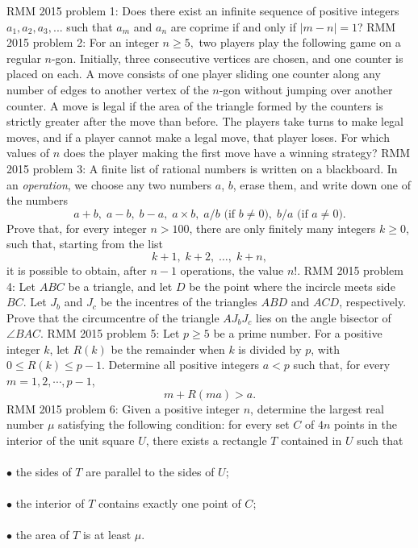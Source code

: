 RMM 2015 problem 1:  Does there exist an infinite sequence of positive integers $a_1, a_2, a_3, . . .$  such that $a_m$ and $a_n$ are coprime if and only if $|m - n| = 1$? 
RMM 2015 problem 2:  For an integer $n \geq 5,$ two players play the following game on a regular $n$-gon. Initially, three consecutive vertices are chosen, and one counter is placed on each. A move consists of one player sliding one counter along any number of edges to another vertex of the $n$-gon without jumping over another counter. A move is legal if the area of the triangle formed by the counters is strictly greater after the move than before. The players take turns to make legal moves, and if a player cannot make a legal move, that player loses. For which values of $n$ does the player making the first move have a winning strategy? 
RMM 2015 problem 3:  A finite list of rational numbers is written on a blackboard. In an \textit{operation}, we choose any two numbers $a$, $b$, erase them, and write down one of the numbers
\[
a + b, \; a - b, \; b - a, \; a \times b, \; a/b \text{ (if $b \neq 0$)}, \; b/a \text{ (if $a \neq 0$)}.
\]
Prove that, for every integer $n > 100$, there are only finitely many integers $k \ge 0$, such that, starting from the list
\[ k + 1, \; k + 2, \; \dots, \; k + n, \]
it is possible to obtain, after $n - 1$ operations, the value $n!$. 
RMM 2015 problem 4:  Let $ABC$ be a triangle, and let $D$ be the point where the incircle meets side $BC$. Let $J_b$ and $J_c$ be the incentres of the triangles $ABD$ and $ACD$, respectively. Prove that the circumcentre of the triangle $AJ_bJ_c$ lies on the angle bisector of $\angle BAC$. 
RMM 2015 problem 5:  Let $p \ge 5$ be a prime number. For a positive integer $k$, let $R(k)$ be the remainder when $k$ is divided by $p$, with $0 \le R(k) \le p-1$. Determine all positive integers $a < p$ such that, for every $m = 1, 2, \cdots, p-1$,
\[ m + R(ma) > a. \] 
RMM 2015 problem 6:  Given a positive integer $n$, determine the largest real number $\mu$ satisfying the following condition: for every set $C$ of $4n$ points in the interior of the unit square $U$, there exists a rectangle $T$ contained in $U$ such that \\\\
$\bullet$ the sides of $T$ are parallel to the sides of $U$; \\\\
$\bullet$ the interior of $T$ contains exactly one point of $C$; \\\\
$\bullet$ the area of $T$ is at least $\mu$. 

